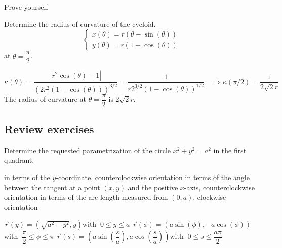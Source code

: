 \begin{Answer}
      Prove yourself
\end{Answer}


\begin{Exercise}[difficulty=2] Determine the radius of curvature  of the cycloid.
    $$\left \{\begin{array}{l}
    x(\theta) = r ( \theta - \sin  (\theta) )\\
    y(\theta) = r ( 1 - \cos  (\theta) )  
    \end{array}\right. $$
     at $\theta=\dfrac{\pi}{2}$. 
\end{Exercise}

\begin{Answer}
    $\kappa (\theta) = \dfrac{\left|r^2 \cos(\theta)-1  \right|}{\left(2r^2(1 - \cos (\theta))  \right)^{3/2}} = \dfrac{1}{r 2^{3/2}(1 - \cos (\theta))^{1/2}} \quad \Rightarrow \kappa (\pi/2) = \dfrac{1}{2 \sqrt{2}r}$ \\[0.2cm]
The radius of curvature at $\theta=\dfrac{\pi}{2}$ is $2 \sqrt{2}r$.
\end{Answer}

\fi

\subsection*{Review exercises}
\begin{Exercise} Determine the requested parametrization of the circle $x^2 + y^2 = a^2$ in the first quadrant. 

    \Question[difficulty = 1] in terms of the $y$-coordinate,  counterclockwise orientation
    \Question[difficulty = 3] in terms of the angle between the tangent at a point $(x,y)$ and the positive $x$-axis,  counterclockwise orientation
    \Question[difficulty = 3] in terms of the arc length measured from $(0,a)$, clockwise orientation

\end{Exercise}

\begin{Answer}
    
        \Question $\vec r (y) = \left(\sqrt{a^2 - y^2},y \right)$\quad with $\ 0 \leq y \leq a$ 
        \Question
          $ \vec r (\phi)= \left(a \sin (\phi), -a \cos (\phi) \right)$\quad with $\  \dfrac{\pi}{2} \leq \phi \leq \pi $ 
        \Question $ \vec r (s) = \left(a \sin \left(\dfrac{s}{a} \right), a \cos \left(\dfrac{s}{a} \right) \right)$\quad with $\  0 \leq s \leq \dfrac{a \pi}{2} $
     
\end{Answer}


